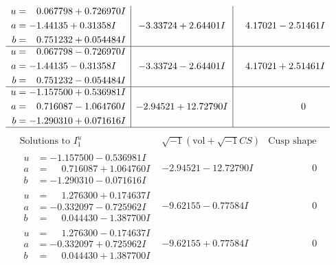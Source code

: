 \documentclass[1p]{elsarticle_modified}
\theoremstyle{definition}
\newcommand{\I}{\sqrt{-1}}
\begin{document}
$$\begin{array}{c|c|c}
\begin{aligned}
u &= \phantom{-}0.067798 + 0.726970 I \\
a &= -1.44135 + 0.31358 I \\
b &= \phantom{-}0.751232 + 0.054484 I\end{aligned}
 & -3.33724 + 2.64401 I & \phantom{-}4.17021 - 2.51461 I \\ \hline\begin{aligned}
u &= \phantom{-}0.067798 - 0.726970 I \\
a &= -1.44135 - 0.31358 I \\
b &= \phantom{-}0.751232 - 0.054484 I\end{aligned}
 & -3.33724 - 2.64401 I & \phantom{-}4.17021 + 2.51461 I \\ \hline\begin{aligned}
u &= -1.157500 + 0.536981 I \\
a &= \phantom{-}0.716087 - 1.064760 I \\
b &= -1.290310 + 0.071616 I\end{aligned}
 & -2.94521 + 12.72790 I & \phantom{-0.000000 } 0\\
 \hline 
 \end{array}$$\newpage$$\begin{array}{c|c|c}  
\text{Solutions to }I^u_{1}& \I (\text{vol} + \sqrt{-1}CS) & \text{Cusp shape}\\
 \hline 
\begin{aligned}
u &= -1.157500 - 0.536981 I \\
a &= \phantom{-}0.716087 + 1.064760 I \\
b &= -1.290310 - 0.071616 I\end{aligned}
 & -2.94521 - 12.72790 I & \phantom{-0.000000 } 0 \\ \hline\begin{aligned}
u &= \phantom{-}1.276300 + 0.174637 I \\
a &= -0.332097 - 0.725962 I \\
b &= \phantom{-}0.044430 - 1.387700 I\end{aligned}
 & -9.62155 - 0.77584 I & \phantom{-0.000000 } 0 \\ \hline\begin{aligned}
u &= \phantom{-}1.276300 - 0.174637 I \\
a &= -0.332097 + 0.725962 I \\
b &= \phantom{-}0.044430 + 1.387700 I\end{aligned}
 & -9.62155 + 0.77584 I & \phantom{-0.000000 } 0 \\ \hline\begin{aligned}

\end{aligned}
\end{array}$$
\end{document}
